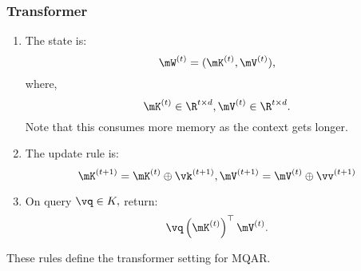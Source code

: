 \subsubsection{Transformer}
\begin{enumerate}[leftmargin=*]
    \item The state is: \[\mW^{(\timestep)} = (\mK^{(\timestep)}, \mV^{(\timestep)}),\] where, \[\mK^{(\timestep)}\in\R^{\timestep\times\modelDim},\mV^{(\timestep)}\in\R^{\timestep\times\modelDim}.\] Note that this consumes more memory as the context gets longer.
    \item The update rule is:
    \[\mK^{(\timestep+1)}=\mK^{(\timestep)}\oplus \vk^{(\timestep+1)}, \mV^{(\timestep+1)}=\mV^{(\timestep)}\oplus \vv^{(\timestep+1)}\]
    \item On query $\vq \in K,$ return:
    \[\vq \left(\mK^{(\timestep)}\right)^{\top}\mV^{(\timestep)}.\]
\end{enumerate}
These rules define the transformer setting for MQAR.

